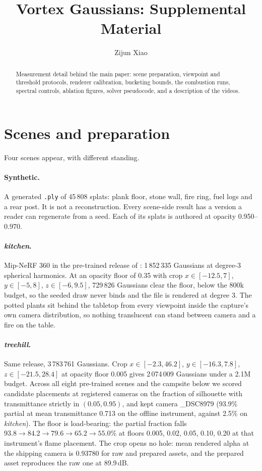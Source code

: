 \documentclass[acmtog,nonacm]{acmart}
\begin{document}
\title{Vortex Gaussians: Supplemental Material}
\author{Zijun Xiao}
\begin{abstract}
Measurement detail behind the main paper: scene preparation, viewpoint and threshold protocols, renderer calibration, bucketing bounds, the combustion runs, spectral controls, ablation figures, solver pseudocode, and a description of the videos.
\end{abstract}
\maketitle

\section{Scenes and preparation}
Four scenes appear, with different standing.

\paragraph{Synthetic.} A generated \texttt{.ply} of 45\,808 splats: plank floor, stone wall, fire ring, fuel logs and a rear post. It is not a reconstruction. Every scene-side result has a version a reader can regenerate from a seed. Each of its splats is authored at opacity 0.950--0.970.

\paragraph{\emph{kitchen}.} Mip-NeRF 360 \cite{barron2022} in the pre-trained release of \citet{kerbl2023}: 1\,852\,335 Gaussians at degree-3 spherical harmonics. At an opacity floor of 0.35 with crop $x\in[-12.5,7]$, $y\in[-5,8]$, $z\in[-6,9.5]$, 729\,826 Gaussians clear the floor, below the 800k budget, so the seeded draw never binds and the file is rendered at degree 3. The potted plants sit behind the tabletop from every viewpoint inside the capture's own camera distribution, so nothing translucent can stand between camera and a fire on the table.

\paragraph{\emph{treehill}.} Same release, 3\,783\,761 Gaussians. Crop $x\in[-2.3,46.2]$, $y\in[-16.3,7.8]$, $z\in[-21.5,28.4]$ at opacity floor 0.005 gives 2\,074\,009 Gaussians under a 2.1M budget. Across all eight pre-trained scenes and the campsite below we scored candidate placements at registered cameras on the fraction of silhouette with transmittance strictly in $(0.05,0.95)$, and kept camera \_DSC8979 (93.9\% partial at mean transmittance 0.713 on the offline instrument, against 2.5\% on \emph{kitchen}). The floor is load-bearing: the partial fraction falls $93.8\to84.2\to79.6\to65.2\to55.0$\% at floors 0.005, 0.02, 0.05, 0.10, 0.20 at that instrument's flame placement. The crop opens no hole: mean rendered alpha at the shipping camera is 0.93780 for raw and prepared assets, and the prepared asset reproduces the raw one at 89.9\,dB.
\end{document}
